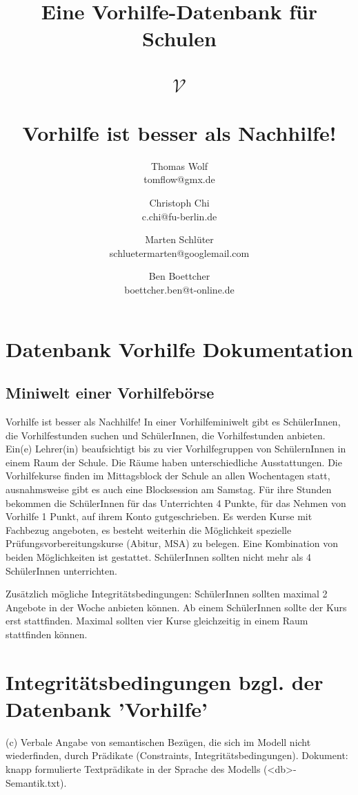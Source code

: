 \documentclass[fleqn]{scrartcl}
\begin{document}
\title{Eine Vorhilfe-Datenbank für Schulen\\ \\  \checkmark $\mathcal{V}$ \\ \\  Vorhilfe ist besser als Nachhilfe!}
\author{Thomas Wolf\\tomflow@gmx.de\and Christoph Chi\\c.chi@fu-berlin.de\and Marten Schlüter\\schluetermarten@googlemail.com\and Ben Boettcher\\boettcher.ben@t-online.de}
\maketitle
\tableofcontents
\section{Datenbank Vorhilfe Dokumentation}
\subsection{Miniwelt einer Vorhilfebörse} 
Vorhilfe ist besser als Nachhilfe!
In einer Vorhilfeminiwelt gibt es SchülerInnen, die Vorhilfestunden suchen und SchülerInnen, die Vorhilfestunden anbieten. 
Ein(e) Lehrer(in) beaufsichtigt bis zu vier Vorhilfegruppen von SchülernInnen in einem Raum der Schule. Die Räume haben unterschiedliche Ausstattungen. 
Die Vorhilfekurse finden im Mittagsblock der Schule an allen Wochentagen statt, ausnahmsweise gibt es auch eine Blocksession am Samstag. 
Für ihre Stunden bekommen die SchülerInnen für das Unterrichten 4 Punkte, für das Nehmen von Vorhilfe 1 Punkt, auf ihrem Konto gutgeschrieben. 
Es werden Kurse mit Fachbezug angeboten, es besteht weiterhin die Möglichkeit spezielle Prüfungsvorbereitungskurse (Abitur, MSA) zu belegen. Eine Kombination von beiden Möglichkeiten ist gestattet.
SchülerInnen sollten nicht mehr als 4 SchülerInnen unterrichten. 

Zusätzlich mögliche Integritätsbedingungen:  
SchülerInnen sollten maximal 2 Angebote in der Woche anbieten können. Ab einem SchülerInnen sollte der Kurs erst stattfinden. Maximal sollten vier Kurse gleichzeitig in einem Raum stattfinden können. 

\section{Integritätsbedingungen bzgl. der Datenbank 'Vorhilfe'} 
(c) Verbale Angabe von semantischen Bezügen, die sich im Modell nicht wiederfinden, durch Prädikate (Constraints, Integritätsbedingungen). Dokument: knapp formulierte Textprädikate in der Sprache des Modells (<db>-Semantik.txt). 
\end{document}
